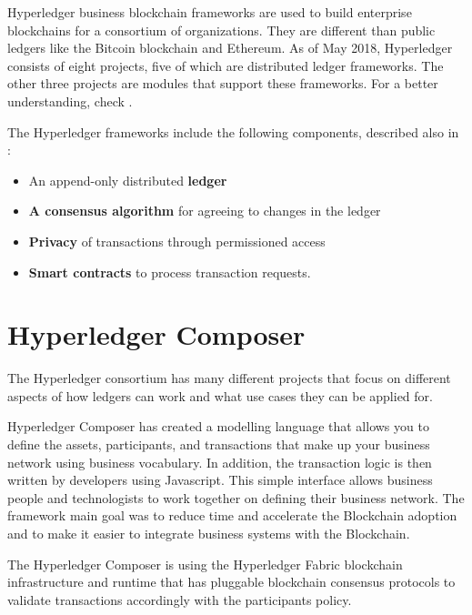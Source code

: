 Hyperledger business blockchain frameworks are used to build enterprise blockchains for a consortium of organizations. They are different than public ledgers like the Bitcoin blockchain and Ethereum.
As of May 2018, Hyperledger consists of eight projects, five of which are distributed ledger frameworks. The other three projects are modules that support these frameworks. For a better understanding, check .

The Hyperledger frameworks include the following components, described also in :
	\begin{itemize}
	\item An append-only distributed \textbf{ledger}
	\item \textbf{A consensus algorithm} for agreeing to changes in the ledger
	\item \textbf{Privacy} of transactions through permissioned access
	\item \textbf{Smart contracts} to process transaction requests.
	\end{itemize}


\section{Hyperledger Composer}
\label{sub-sec:chapter1-section2}
The Hyperledger consortium has many different projects that focus on different aspects of how ledgers can work and what use cases they can be applied for.

Hyperledger Composer has created a modelling language that allows you to define the assets, participants, and transactions that make up your business network using business vocabulary. In addition, the transaction logic is then written by developers using Javascript. This simple interface allows business people and technologists to work together on defining their business network.
The framework main goal was to reduce time and accelerate the Blockchain adoption and to make it easier to integrate business systems with the Blockchain.

The Hyperledger Composer is using the Hyperledger Fabric blockchain infrastructure and runtime that has pluggable blockchain consensus protocols to validate transactions  accordingly with the participants policy.

